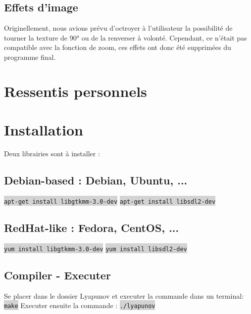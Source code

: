 \documentclass{article}
\newcommand\code[1]{ \colorbox{lightgray}{\texttt{#1}}}
\begin{document}
	\subsection{Effets d'image}

	Originellement, nous avions prévu d'octroyer à l'utilisateur la possibilité de tourner la texture de 90° ou de la renverser à volonté.
    Cependant, ce n'était pas compatible avec la fonction de zoom, ces effets ont donc été supprimées du programme final.

    \section{Ressentis personnels}

	\section{Installation}
	Deux librairies sont à installer :
	\subsection* {Debian-based : Debian, Ubuntu, ...}
		\code{apt-get install libgtkmm-3.0-dev} \newline
		\code{apt-get install libsdl2-dev}
	\subsection* {RedHat-like : Fedora, CentOS, ...}
		\code{yum install libgtkmm-3.0-dev} \newline
		\code{yum install libsdl2-dev}
	\subsection* {Compiler - Executer}
		Se placer dans le dossier Lyapunov et executer la commande dans un terminal: \newline
		\code{make} \newline
		Executer ensuite la commande :\newline
		\code{./lyapunov}
\end{document}
